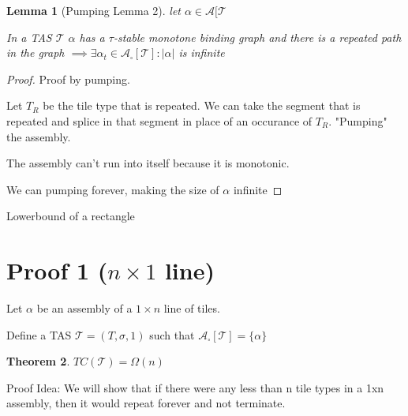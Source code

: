 \documentclass[12pt]{article}
\newtheorem{theorem}{Theorem}
\newtheorem{lemma}[theorem]{Lemma}
\begin{document}
\begin{lemma}[Pumping Lemma 2]
    let $\alpha \in \mathcal{A}[\mathcal{T}$

    In a TAS $\mathcal{T}$  $\alpha$ has a $\tau$-stable monotone binding graph and there is a repeated path in the graph $\implies \exists \alpha_t \in \mathcal{A}_\square[\mathcal{T}] : |\alpha| $ is infinite
\end{lemma}

\begin{proof}
    Proof by pumping. 

    Let $T_R$ be the tile type that is repeated. We can take the segment that is repeated and splice in that segment in place of an occurance of $T_R$. "Pumping" the assembly. 

    The assembly can't run into itself because it is monotonic.

    We can pumping forever, making the size of $\alpha$ infinite 

\end{proof}


Lowerbound of a rectangle


\section*{Proof 1 ($n \times 1 $ line)}

Let $\alpha$ be an assembly of a $1 \times n$ line of tiles.

Define a TAS $\mathcal{T} = (T, \sigma, 1)$ such that $\mathcal{A}_\square[\mathcal{T}] = \{ \alpha \}$

\begin{theorem}
	$TC(\mathcal{T}) = \Omega(n)$
\end{theorem}

Proof Idea:  We will show that if there were any less than n tile types in a 1xn assembly, then it would repeat forever and not terminate.
\end{document}
